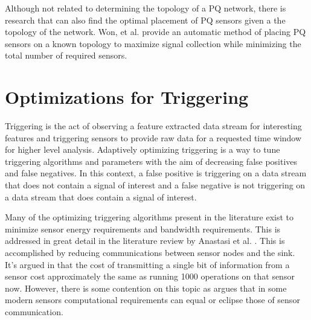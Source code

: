 Although not related to determining the topology of a PQ network, there is research that can also find the optimal placement of PQ sensors given a the topology of the network. Won, et al.\cite{won2008optimal} provide an automatic method of placing PQ sensors on a known topology to maximize signal collection while minimizing the total number of required sensors.  

\section{Optimizations for Triggering}
Triggering is the act of observing a feature extracted data stream for interesting features and triggering sensors to provide raw data for a requested time window for higher level analysis. Adaptively optimizing triggering is a way to tune triggering algorithms and parameters with the aim of decreasing false positives and false negatives. In this context, a false positive is triggering on a data stream that does not contain a signal of interest and a false negative is not triggering on a data stream that does contain a signal of interest. 

Many of the optimizing triggering algorithms present in the literature exist to minimize sensor energy requirements and bandwidth requirements. This is addressed in great detail in the literature review by Anastasi et al. \cite{anastasi_energy_2009}. This is accomplished by reducing communications between sensor nodes and the sink. It's argued in \cite{pottie2000wireless} that the cost of transmitting a single bit of information from a sensor cost approximately the same as running 1000 operations on that sensor now. However, there is some contention on this topic as \cite{alippi_adaptive_2010} argues that in some modern sensors computational requirements can equal or eclipse those of  sensor communication.  


